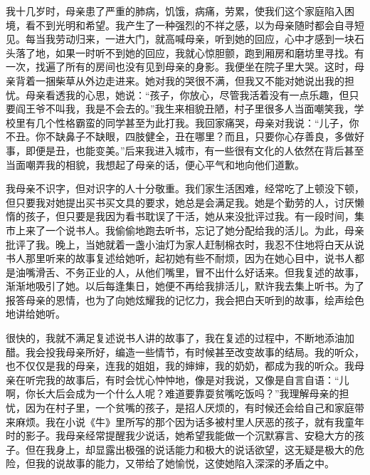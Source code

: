 \documentclass[fontset=fandol,12pt,a5paper]{ctexbook}
\begin{document}
我十几岁时，母亲患了严重的肺病，饥饿，病痛，劳累，使我们这个家庭陷入困境，看不到光明和希望。我产生了一种强烈的不祥之感，以为母亲随时都会自寻短见。每当我劳动归来，一进大门，就高喊母亲，听到她的回应，心中才感到一块石头落了地，如果一时听不到她的回应，我就心惊胆颤，跑到厢房和磨坊里寻找。有一次，找遍了所有的房间也没有见到母亲的身影。我便坐在院子里大哭。这时，母亲背着一捆柴草从外边走进来。她对我的哭很不满，但我又不能对她说出我的担忧。母亲看透我的心思，她说：“孩子，你放心，尽管我活着没有一点乐趣，但只要阎王爷不叫我，我是不会去的。”我生来相貌丑陋，村子里很多人当面嘲笑我，学校里有几个性格霸蛮的同学甚至为此打我。我回家痛哭，母亲对我说：“儿子，你不丑。你不缺鼻子不缺眼，四肢健全，丑在哪里？而且，只要你心存善良，多做好事，即便是丑，也能变美。”后来我进入城市，有一些很有文化的人依然在背后甚至当面嘲弄我的相貌，我想起了母亲的话，便心平气和地向他们道歉。

我母亲不识字，但对识字的人十分敬重。我们家生活困难，经常吃了上顿没下顿，但只要我对她提出买书买文具的要求，她总是会满足我。她是个勤劳的人，讨厌懒惰的孩子，但只要是我因为看书耽误了干活，她从来没批评过我。有一段时间，集市上来了一个说书人。我偷偷地跑去听书，忘记了她分配给我的活儿。为此，母亲批评了我。晚上，当她就着一盏小油灯为家人赶制棉衣时，我忍不住地将白天从说书人那里听来的故事复述给她听，起初她有些不耐烦，因为在她心目中，说书人都是油嘴滑舌、不务正业的人，从他们嘴里，冒不出什么好话来。但我复述的故事，渐渐地吸引了她。以后每逢集日，她便不再给我排活儿，默许我去集上听书。为了报答母亲的恩情，也为了向她炫耀我的记忆力，我会把白天听到的故事，绘声绘色地讲给她听。

很快的，我就不满足复述说书人讲的故事了，我在复述的过程中，不断地添油加醋。我会投我母亲所好，编造一些情节，有时候甚至改变故事的结局。我的听众，也不仅仅是我的母亲，连我的姐姐，我的婶婶，我的奶奶，都成为我的听众。我母亲在听完我的故事后，有时会忧心忡忡地，像是对我说，又像是自言自语：“儿啊，你长大后会成为一个什么人呢？难道要靠耍贫嘴吃饭吗？”我理解母亲的担忧，因为在村子里，一个贫嘴的孩子，是招人厌烦的，有时候还会给自己和家庭带来麻烦。我在小说《牛》里所写的那个因为话多被村里人厌恶的孩子，就有我童年时的影子。我母亲经常提醒我少说话，她希望我能做一个沉默寡言、安稳大方的孩子。但在我身上，却显露出极强的说话能力和极大的说话欲望，这无疑是极大的危险，但我的说故事的能力，又带给了她愉悦，这使她陷入深深的矛盾之中。
\end{document}
